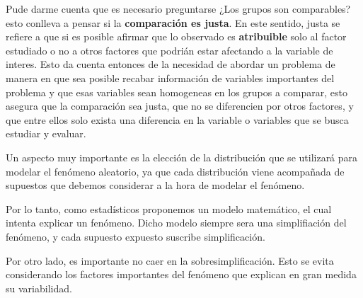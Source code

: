 \documentclass[
  letterpaper,
  DIV=11,
  numbers=noendperiod]{scrreprt}
\begin{document}
\begin{tcolorbox}[enhanced jigsaw, arc=.35mm, bottomrule=.15mm, bottomtitle=1mm, breakable, colback=white, colbacktitle=quarto-callout-note-color!10!white, colframe=quarto-callout-note-color-frame, coltitle=black, left=2mm, leftrule=.75mm, opacityback=0, opacitybacktitle=0.6, rightrule=.15mm, title=\textcolor{quarto-callout-note-color}{\faInfo}\hspace{0.5em}{Pensamiento importante}, titlerule=0mm, toprule=.15mm, toptitle=1mm]

Pude darme cuenta que es necesario preguntarse ¿Los grupos son
comparables? esto conlleva a pensar si la \textbf{comparación es justa}.
En este sentido, justa se refiere a que si es posible afirmar que lo
observado es \textbf{atribuible} solo al factor estudiado o no a otros
factores que podrián estar afectando a la variable de interes. Esto da
cuenta entonces de la necesidad de abordar un problema de manera en que
sea posible recabar información de variables importantes del problema y
que esas variables sean homogeneas en los grupos a comparar, esto
asegura que la comparación sea justa, que no se diferencien por otros
factores, y que entre ellos solo exista una diferencia en la variable o
variables que se busca estudiar y evaluar.

\end{tcolorbox}

Un aspecto muy importante es la elección de la distribución que se
utilizará para modelar el fenómeno aleatorio, ya que cada distribución
viene acompañada de supuestos que debemos considerar a la hora de
modelar el fenómeno.

\begin{tcolorbox}[enhanced jigsaw, arc=.35mm, bottomrule=.15mm, bottomtitle=1mm, breakable, colback=white, colbacktitle=quarto-callout-important-color!10!white, colframe=quarto-callout-important-color-frame, coltitle=black, left=2mm, leftrule=.75mm, opacityback=0, opacitybacktitle=0.6, rightrule=.15mm, title={Modelos, supuestos y simplificación}, titlerule=0mm, toprule=.15mm, toptitle=1mm]

Por lo tanto, como estadísticos proponemos un modelo matemático, el cual
intenta explicar un fenómeno. Dicho modelo siempre sera una
simplifiación del fenómeno, y cada supuesto expuesto suscribe
simplificación.

Por otro lado, es importante no caer en la sobresimplificación. Esto se
evita considerando los factores importantes del fenómeno que explican en
gran medida su variabilidad.

\end{tcolorbox}
\end{document}
